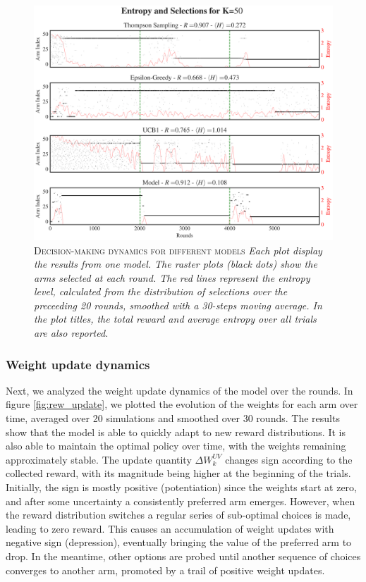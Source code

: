 \begin{figure}[H]
    \centering
    \includegraphics[width=1.0\textwidth]{figures/performance_analysis_KABv0.png}
    \caption{\textsc{Decision-making dynamics for different models} \textit{Each plot display the results from one model. The raster plots (black dots) show the arms selected at each round.
The red lines represent the entropy level, calculated from the distribution of selections over the preceeding 20 rounds, smoothed with a 30-steps moving average. In the plot titles, the total reward and average entropy over all trials are also reported.}}
    \label{fig:entropy_fig1}
\end{figure}


\subsubsection{Weight update dynamics}
\noindent Next, we analyzed the weight update dynamics of the model over the rounds.
In figure \ref{fig:rew_update}, we plotted the evolution of the weights for each arm over time, averaged over 20 simulations and smoothed over 30 rounds.
The results show that the model is able to quickly adapt to new reward distributions. It is also able to maintain the optimal policy over time, with the weights remaining approximately stable.
The update quantity $\Delta W_{k}^{UV}$ changes sign according to the collected reward, with its magnitude being higher at the beginning of the trials.
Initially, the sign is mostly positive (potentiation) since the weights start at zero, and after some uncertainty a consistently preferred arm emerges.
However, when the reward distribution switches a regular series of sub-optimal choices is made, leading to zero reward.
This causes an accumulation of weight updates with negative sign (depression), eventually bringing the value of the preferred arm to drop. In the meantime, other options are probed until another sequence of choices converges to another arm, promoted by a trail of positive weight updates.

